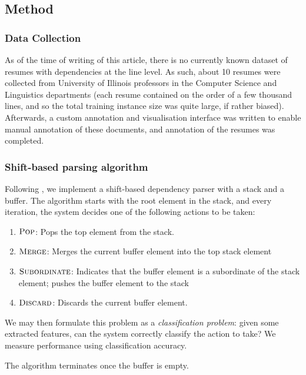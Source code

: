 \documentclass[11pt]{article}
\begin{document}
\subsection{Method}
\subsubsection{Data Collection}
As of the time of writing of this article, there is no currently known dataset of resumes with dependencies at the line level. As such, about 10 resumes were collected from University of Illinois professors in the Computer Science and Linguistics departments (each resume contained on the order of a few thousand lines, and so the total training instance size was quite large, if rather biased). Afterwards, a custom annotation and visualisation interface was written to enable manual annotation of these documents, and annotation of the resumes was completed. 

\subsubsection{Shift-based parsing algorithm}

Following \citep{dozat2018simpler}, we implement a shift-based dependency parser with a stack and a buffer. The algorithm starts with the root element in the stack, and every iteration, the system decides one of the following actions to be taken: 
\begin{enumerate}
	\item $\textsc{Pop}$: Pops the top element from the stack. 
	\item $\textsc{Merge}$: Merges the current buffer element into the top stack element
	\item $\textsc{Subordinate}$: Indicates that the buffer element is a subordinate of the stack element; pushes the buffer element to the stack
	\item $\textsc{Discard}$: Discards the current buffer element.
\end{enumerate}
We may then formulate this problem as a \emph{classification problem}: given some extracted features, can the system correctly classify the action to take? We measure performance using classification accuracy. 

The algorithm terminates once the buffer is empty.
\end{document}
